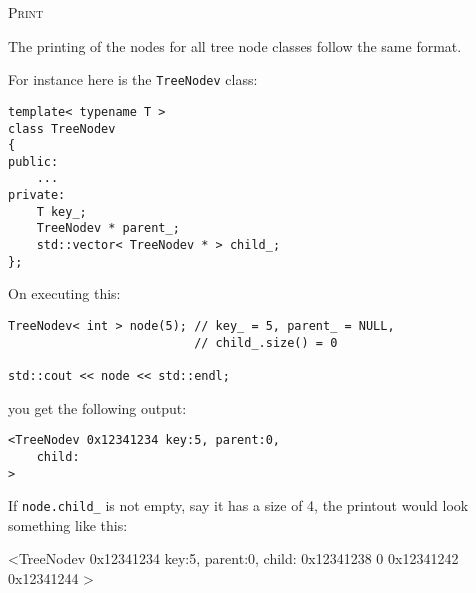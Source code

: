 \textsc{Print}

The printing of the nodes for all tree node classes follow the same format.

For instance here is the \verb!TreeNodev! class:
\begin{Verbatim}[frame=single,fontsize=\footnotesize]
template< typename T >
class TreeNodev 
{
public:
    ...
private:
    T key_;
    TreeNodev * parent_;
    std::vector< TreeNodev * > child_; 
};
\end{Verbatim}
On executing this:
\begin{Verbatim}[frame=single,fontsize=\footnotesize]
TreeNodev< int > node(5); // key_ = 5, parent_ = NULL, 
                          // child_.size() = 0

std::cout << node << std::endl;
\end{Verbatim}
you get the following output:
\begin{Verbatim}[frame=single,fontsize=\footnotesize]
<TreeNodev 0x12341234 key:5, parent:0,
    child:
>
\end{Verbatim}
If \verb!node.child_! is not empty, say it has a size of 4,
the printout would look something like this:
\begin{console}
<TreeNodev 0x12341234 key:5, parent:0,
    child:
        0x12341238
        0
        0x12341242
        0x12341244
>
\end{console}

